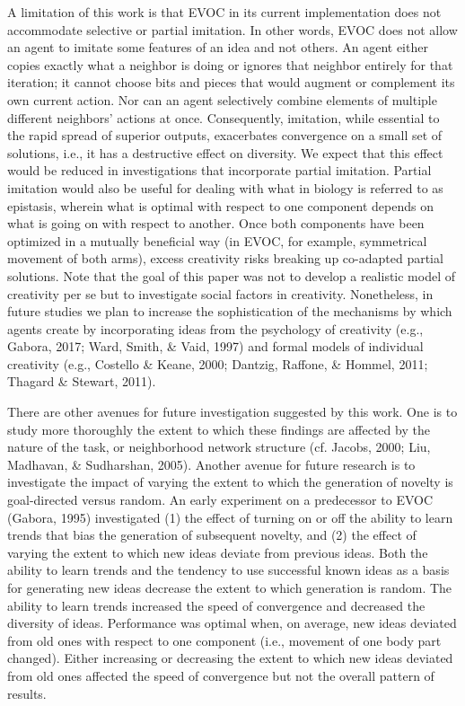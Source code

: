 \documentclass[a4paper,12pt,man,british]{apa6}
\begin{document}
A limitation of this work is that EVOC in its current implementation does not accommodate selective or partial imitation. In other words, EVOC does not allow an agent to imitate some features of an idea and not others. An agent either copies exactly what a neighbor is doing or ignores that neighbor entirely for that iteration; it cannot choose bits and pieces that would augment or complement its own current action. Nor can an agent selectively combine elements of multiple different neighbors' actions at once. Consequently, imitation, while essential to the rapid spread of superior outputs, exacerbates convergence on a small set of solutions, i.e., it has a destructive effect on diversity. We expect that this effect would be reduced in investigations that incorporate partial imitation. Partial imitation would also be useful for dealing with what in biology is referred to as epistasis, wherein what is optimal with respect to one component depends on what is going on with respect to another. Once both components have been optimized in a mutually beneficial way (in EVOC, for example, symmetrical movement of both arms), excess creativity risks breaking up co-adapted partial solutions. Note that the goal of this paper was not to develop a realistic model of creativity per se but to investigate social factors in creativity. Nonetheless, in future studies we plan to increase the sophistication of the mechanisms by which agents create by incorporating ideas from the psychology of creativity (e.g., Gabora, 2017; Ward, Smith, \& Vaid, 1997) and formal models of individual creativity (e.g., Costello \& Keane, 2000; Dantzig, Raffone, \& Hommel, 2011; Thagard \& Stewart, 2011). 

There are other avenues for future investigation suggested by this work. One is to study more thoroughly the extent to which these findings are affected by the nature of the task, or neighborhood network structure (cf. Jacobs, 2000; Liu, Madhavan, \& Sudharshan, 2005). Another avenue for future research is to investigate the impact of varying the extent to which the generation of novelty is goal-directed versus random. An early experiment on a predecessor to EVOC (Gabora, 1995) investigated (1) the effect of turning on or off the ability to learn trends that bias the generation of subsequent novelty, and (2) the effect of varying the extent to which new ideas deviate from previous ideas. Both the ability to learn trends and the tendency to use successful known ideas as a basis for generating new ideas decrease the extent to which generation is random. The ability to learn trends increased the speed of convergence and decreased the diversity of ideas. Performance was optimal when, on average, new ideas deviated from old ones with respect to one component (i.e., movement of one body part changed). Either increasing or decreasing the extent to which new ideas deviated from old ones affected the speed of convergence but not the overall pattern of results. 
\end{document}
